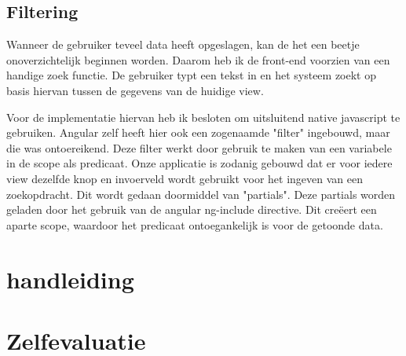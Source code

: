\documentclass[a4paper,11pt]{article}
\begin{document}
\subsection{Filtering}
Wanneer de gebruiker teveel data heeft opgeslagen, kan de het een beetje onoverzichtelijk beginnen worden. Daarom heb ik de front-end voorzien van een handige zoek functie. De gebruiker typt een tekst in en het systeem zoekt op basis hiervan tussen de gegevens van de huidige view.

Voor de implementatie hiervan heb ik besloten om uitsluitend native javascript te gebruiken. Angular zelf heeft hier ook een zogenaamde "filter" ingebouwd, maar die was ontoereikend. Deze filter werkt door gebruik te maken van een variabele in de scope als predicaat. Onze applicatie is zodanig gebouwd dat er voor iedere view dezelfde knop en invoerveld wordt gebruikt voor het ingeven van een zoekopdracht. Dit wordt gedaan doormiddel van "partials". Deze partials worden geladen door het gebruik van de angular ng-include directive. Dit creëert een aparte scope, waardoor het predicaat ontoegankelijk is voor de getoonde data.


\section{handleiding}

\section{Zelfevaluatie}
\end{document}
